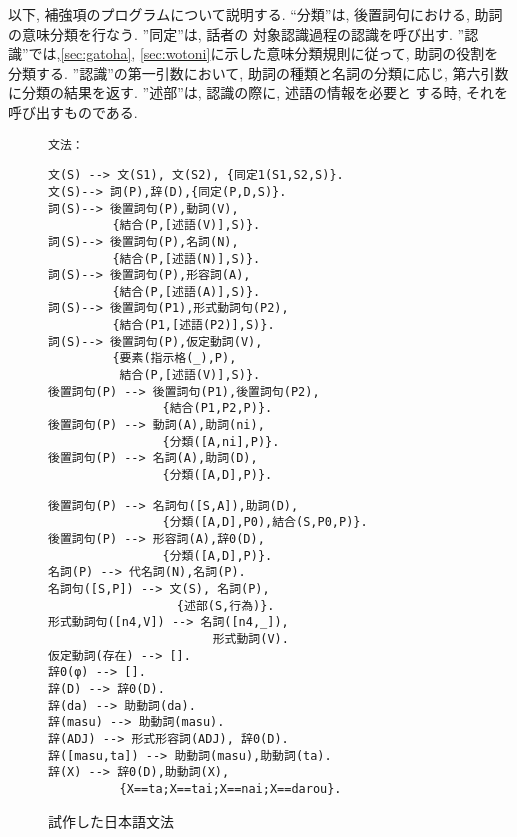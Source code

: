 以下, 補強項のプログラムについて説明する. 
``分類''は, 後置詞句における, 助詞の意味分類を行なう. ''同定''は, 話者の
対象認識過程の認識を呼び出す. ''認識''では,\ref{sec:gatoha},
 \ref{sec:wotoni}に示した意味分類規則に従って, 助詞の役割を分類する. 
''認識''の第一引数において, 助詞の種類と名詞の分類に応じ, 
第六引数に分類の結果を返す. ''述部''は, 認識の際に, 述語の情報を必要と
する時, それを呼び出すものである. 

\newpage


\begin{figure}[htb]
\footnotesize
\verb|文法：|\\
\begin{minipage}[t]{.48\textwidth}
\begin{verbatim}
文(S) --> 文(S1), 文(S2), {同定1(S1,S2,S)}.
文(S)--> 詞(P),辞(D),{同定(P,D,S)}.
詞(S)--> 後置詞句(P),動詞(V),
         {結合(P,[述語(V)],S)}.
詞(S)--> 後置詞句(P),名詞(N),
         {結合(P,[述語(N)],S)}.
詞(S)--> 後置詞句(P),形容詞(A),
         {結合(P,[述語(A)],S)}.
詞(S)--> 後置詞句(P1),形式動詞句(P2),
         {結合(P1,[述語(P2)],S)}.
詞(S)--> 後置詞句(P),仮定動詞(V),
         {要素(指示格(_),P),
          結合(P,[述語(V)],S)}.
後置詞句(P) --> 後置詞句(P1),後置詞句(P2),
                {結合(P1,P2,P)}.
後置詞句(P) --> 動詞(A),助詞(ni),
                {分類([A,ni],P)}.
後置詞句(P) --> 名詞(A),助詞(D),
                {分類([A,D],P)}.
\end{verbatim}
\end{minipage}
\begin{minipage}[t]{.48\textwidth}
\begin{verbatim}
後置詞句(P) --> 名詞句([S,A]),助詞(D),
                {分類([A,D],P0),結合(S,P0,P)}.
後置詞句(P) --> 形容詞(A),辞0(D),
                {分類([A,D],P)}.
名詞(P) --> 代名詞(N),名詞(P).
名詞句([S,P]) --> 文(S), 名詞(P),
                  {述部(S,行為)}.
形式動詞句([n4,V]) --> 名詞([n4,_]), 
                       形式動詞(V).
仮定動詞(存在) --> [].
辞0(φ) --> [].
辞(D) --> 辞0(D).
辞(da) --> 助動詞(da).
辞(masu) --> 助動詞(masu).
辞(ADJ) --> 形式形容詞(ADJ), 辞0(D).
辞([masu,ta]) --> 助動詞(masu),助動詞(ta).
辞(X) --> 辞0(D),助動詞(X),
          {X==ta;X==tai;X==nai;X==darou}.
\end{verbatim}
\end{minipage}

\normalsize
\caption{試作した日本語文法}
\label{fig:gram}
\end{figure}

